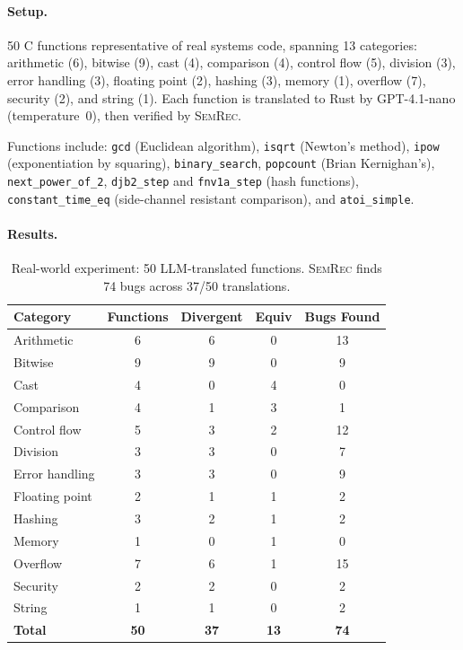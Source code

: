 \documentclass[11pt,a4paper]{article}
\begin{document}
\paragraph{Setup.} 50 C functions representative of real systems code,
spanning 13 categories: arithmetic (6), bitwise (9), cast (4),
comparison (4), control flow (5), division (3), error handling (3),
floating point (2), hashing (3), memory (1), overflow (7), security (2),
and string (1).  Each function is translated to Rust by GPT-4.1-nano
(temperature~0), then verified by \textsc{SemRec}.

Functions include: \texttt{gcd} (Euclidean algorithm), \texttt{isqrt}
(Newton's method), \texttt{ipow} (exponentiation by squaring),
\texttt{binary\_search}, \texttt{popcount} (Brian Kernighan's),
\texttt{next\_power\_of\_2}, \texttt{djb2\_step} and
\texttt{fnv1a\_step} (hash functions), \texttt{constant\_time\_eq}
(side-channel resistant comparison), and \texttt{atoi\_simple}.

\paragraph{Results.}

\begin{table}[t]
\centering
\small
\caption{Real-world experiment: 50 LLM-translated functions.
\textsc{SemRec} finds 74 bugs across 37/50 translations.}
\label{tab:realworld}
\begin{tabular}{@{}lcccc@{}}
\toprule
Category & Functions & Divergent & Equiv & Bugs Found \\
\midrule
Arithmetic       & 6 & 6 & 0 & 13 \\
Bitwise          & 9 & 9 & 0 & 9 \\
Cast             & 4 & 0 & 4 & 0 \\
Comparison       & 4 & 1 & 3 & 1 \\
Control flow     & 5 & 3 & 2 & 12 \\
Division         & 3 & 3 & 0 & 7 \\
Error handling   & 3 & 3 & 0 & 9 \\
Floating point   & 2 & 1 & 1 & 2 \\
Hashing          & 3 & 2 & 1 & 2 \\
Memory           & 1 & 0 & 1 & 0 \\
Overflow         & 7 & 6 & 1 & 15 \\
Security         & 2 & 2 & 0 & 2 \\
String           & 1 & 1 & 0 & 2 \\
\midrule
\textbf{Total}   & \textbf{50} & \textbf{37} & \textbf{13} & \textbf{74} \\
\bottomrule
\end{tabular}
\end{table}
\end{document}
